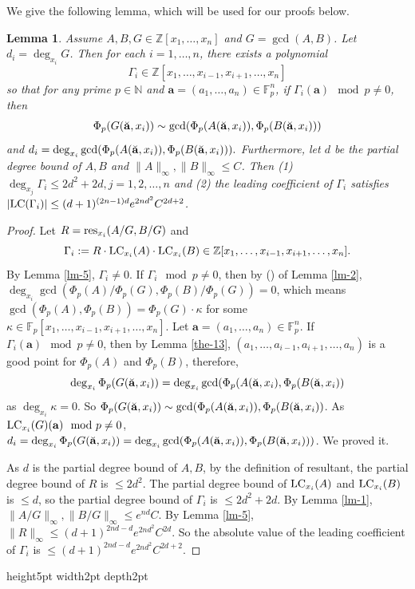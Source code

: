 \documentclass[final,20pt]{elsarticle}
\newtheorem{lemma}[theorem]{Lemma}
\def\N{{\mathbb N}}
\def\Z{{\mathbb Z}}
\def\F{{\mathbb{F}}}
\def\res{\hbox{\rm{res}}}
\def\LC{\hbox{\rm{LC}}}
\def\qed{\hfil {\vrule height5pt width2pt depth2pt}}
\begin{document}
We give the following lemma, which will be used for our proofs below.
\begin{lemma}\label{lm-16}
Assume $A,B,G\in\Z[x_1,\dots,x_n]$ and $G=\gcd(A,B)$. Let $d_i=\deg_{x_i}G$. Then for each $i=1,\dots,n$,  there exists a polynomial $$\Gamma_i\in \Z[x_1,\dots,x_{i-1},x_{i+1},\dots,x_{n}]$$ so that for any prime $p\in\N$ and $\mathbf{a}=(a_1,\dots,a_{n})\in \mathbb{F}^{n}_p$, if $\Gamma_i(\mathbf{a})\mod p\neq 0$, then
$$\Phi_p(G(\Breve{\mathbf{a}},x_i)) \sim\gcd(\Phi_p(A(\Breve{\mathbf{a}},x_i)),\Phi_p(B(\Breve{\mathbf{a}},x_i)))$$ and $d_i=\deg_{x_i}\gcd(\Phi_p(A(\Breve{\mathbf{a}},x_i)),\Phi_p(B(\Breve{\mathbf{a}},x_i))).$
%
Furthermore, let $d$ be the partial degree bound of $A,B$ and $\|A\|_{\infty},\|B\|_{\infty}\leq C$. Then
(1) $\deg_{x_j}\Gamma_i\leq 2d^2+2d,j=1,2,\dots,n$ and (2) the leading coefficient of $\Gamma_i$ satisfies $|\LC(\Gamma_i)|\leq (d+1)^{(2n-1)d}e^{2nd^2}C^{2d+2}$.

\end{lemma}
\begin{proof}
Let $R=\res_{x_i}(A/G,B/G)$ and $$\Gamma_i:=R\cdot \LC_{x_i}(A)\cdot \LC_{x_i}(B)\in \Z[x_1,\dots,x_{i-1},x_{i+1},\dots,x_n].$$ By Lemma \ref{lm-5}, $\Gamma_i\neq 0$.
%
If $\Gamma_i \mod p\neq 0$, then by (\lowercase\expandafter{}) of Lemma \ref{lm-2}, $\deg_{x_i}\gcd(\Phi_p(A)/\Phi_p(G),\Phi_p(B)/\Phi_p(G))=0$, which means $\gcd(\Phi_p(A),\Phi_p(B))=\Phi_p(G)\cdot \kappa$ for some $\kappa\in\F_p[x_1,\dots,x_{i-1},x_{i+1},\dots,x_n]$.
%
Let $\mathbf{a}=(a_1,\dots,a_{n})\in\F_p^{n}$.
%
If $\Gamma_i(\mathbf{a}) \mod p\neq 0$,
then by Lemma \ref{the-13}, $(a_1,\dots,a_{i-1},a_{i+1},\dots,a_n)$ is a good point for $\Phi_p(A)$ and $\Phi_p(B)$, therefore, $$\deg_{x_i}\Phi_p(G(\Breve{\mathbf{a}},x_i))=\deg_{x_i}\gcd(\Phi_p(A(\Breve{\mathbf{a}},x_i),\Phi_p(B(\Breve{\mathbf{a}},x_i))$$ as $\deg_{x_i}\kappa=0$.
%
So $\Phi_p(G(\Breve{\mathbf{a}},x_i))\sim\gcd(\Phi_p(A(\Breve{\mathbf{a}},x_i)),\Phi_p(B(\Breve{\mathbf{a}},x_i))$.  As $\LC_{x_i}(G)(\mathbf{a})\mod p\neq 0$, $d_i=\deg_{x_i}\Phi_p(G(\Breve{\mathbf{a}},x_i))=\deg_{x_i}\gcd(\Phi_p(A(\Breve{\mathbf{a}},x_i)),\Phi_p(B(\Breve{\mathbf{a}},x_i)))$. We proved it.

As $d$ is the partial degree bound of $A,B$,  by the definition of resultant, the partial degree bound of $R$ is $\leq 2d^2$. The partial degree bound of $\LC_{x_i}(A)$ and $\LC_{x_i}(B)$ is $\leq d$, so the partial degree bound of $\Gamma_i$ is $\leq 2d^2+2d$.
%
By Lemma \ref{lm-1}, $\|A/G\|_{\infty},\|B/G\|_{\infty}\leq e^{nd}C$.
By Lemma \ref{lm-5}, $\|R\|_{\infty}\leq (d+1)^{2nd-d}e^{2nd^2}C^{2d}$.
%
So the absolute value of the leading coefficient of $\Gamma_i$ is $\leq (d+1)^{2nd-d}e^{2nd^2}C^{2d+2}$.
%
\end{proof}\qed
\end{document}
